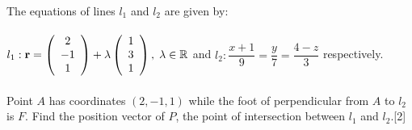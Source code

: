 \documentclass[12pt, a4 paper]{article}
\begin{document}
\begin{outline}[enumerate]
					\color{black}
					\1  The equations of lines ${l_1}$ and ${l_2}$ are given by:\\\\${l_1}:{\bf{r}} = \left( {\begin{array}{*{20}{c}}2\\{ - 1}\\1\end{array}} \right) + \lambda \left( {\begin{array}{*{20}{c}}1\\3\\1\end{array}} \right),\;\lambda  \in \mathbb{R}$ and ${l_2}:\dfrac{{x + 1}}{9} = \dfrac{y}{7} = \dfrac{{4 - z}}{3}$ respectively.\\\\Point $A$ has coordinates $(2, - 1,1)$ while the foot of perpendicular from $A$ to ${l_2}$ is $F$.
					\2 Find the position vector of $P$, the point of intersection between ${l_1}$ and ${l_2}$.\hfill[2]
					\color{blue}
					\begin{align*}

\end{align*}
\end{outline}
\end{document}

